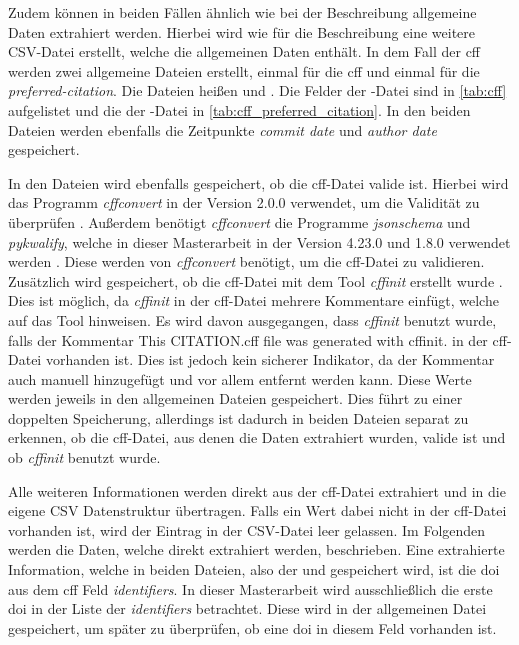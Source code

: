Zudem können in beiden Fällen ähnlich wie bei der Beschreibung allgemeine Daten extrahiert werden.
Hierbei wird wie für die Beschreibung eine weitere CSV-Datei erstellt, welche die allgemeinen Daten enthält.
In dem Fall der \gls{cff} werden zwei allgemeine Dateien erstellt, einmal für die \gls{cff} und einmal für die \emph{preferred-citation}.
Die Dateien heißen  und .
Die Felder der -Datei sind in \autoref{tab:cff} aufgelistet und die der -Datei in \autoref{tab:cff_preferred_citation}.
In den beiden Dateien werden ebenfalls die Zeitpunkte \emph{commit date} und \emph{author date} gespeichert.

In den Dateien wird ebenfalls gespeichert, ob die \gls{cff}-Datei valide ist.
Hierbei wird das Programm \emph{cffconvert} in der Version 2.0.0 verwendet, um die Validität zu überprüfen \autocite{spaaks_cffconvert_2021}.
Außerdem benötigt \emph{cffconvert} die Programme \emph{jsonschema} und \emph{pykwalify}, welche in dieser Masterarbeit in der Version 4.23.0 und 1.8.0 verwendet werden \autocites{berman_jsonschema_2024}{grokzen_pykwalify_2020}.
Diese werden von \emph{cffconvert} benötigt, um die \gls{cff}-Datei zu validieren.
Zusätzlich wird gespeichert, ob die \gls{cff}-Datei mit dem Tool \emph{cffinit} erstellt wurde \autocite{spaaks_cffinit_2023}.
Dies ist möglich, da \emph{cffinit} in der \gls{cff}-Datei mehrere Kommentare einfügt, welche auf das Tool hinweisen.
Es wird davon ausgegangen, dass \emph{cffinit} benutzt wurde, falls der Kommentar \glqq This CITATION.cff file was generated with cffinit.\grqq{} in der \gls{cff}-Datei vorhanden ist.
Dies ist jedoch kein sicherer Indikator, da der Kommentar auch manuell hinzugefügt und vor allem entfernt werden kann.
Diese Werte werden jeweils in den allgemeinen Dateien gespeichert.
Dies führt zu einer doppelten Speicherung, allerdings ist dadurch in beiden Dateien separat zu erkennen, ob die \gls{cff}-Datei, aus denen die Daten extrahiert wurden, valide ist und ob \emph{cffinit} benutzt wurde.

Alle weiteren Informationen werden direkt aus der \gls{cff}-Datei extrahiert und in die eigene CSV Datenstruktur übertragen.
Falls ein Wert dabei nicht in der \gls{cff}-Datei vorhanden ist, wird der Eintrag in der CSV-Datei leer gelassen.
Im Folgenden werden die Daten, welche direkt extrahiert werden, beschrieben.
Eine extrahierte Information, welche in beiden Dateien, also der  und  gespeichert wird, ist die \gls{doi} aus dem \gls{cff} Feld \emph{identifiers}.
In dieser Masterarbeit wird ausschließlich die erste \gls{doi} in der Liste der \emph{identifiers} betrachtet.
Diese wird in der allgemeinen Datei gespeichert, um später zu überprüfen, ob eine \gls{doi} in diesem Feld vorhanden ist.

